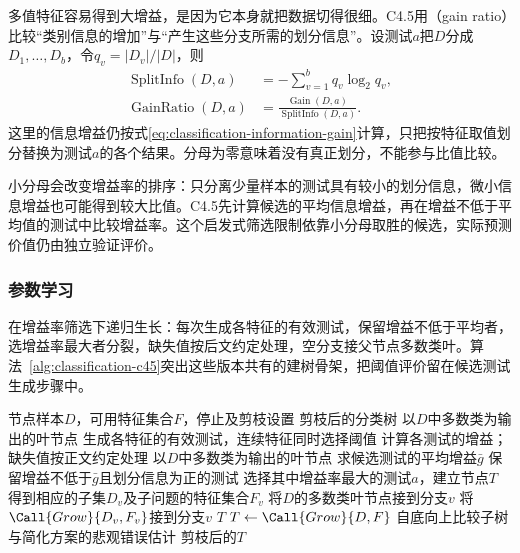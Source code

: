 多值特征容易得到大增益，是因为它本身就把数据切得很细。C4.5用（gain ratio）比较“类别信息的增加”与“产生这些分支所需的划分信息”。设测试$a$把$D$分成$D_1,\ldots,D_b$，令$q_v=|D_v|/|D|$，则
\begin{align}
  \operatorname{SplitInfo}(D,a)
  &=-\sum_{v=1}^{b}q_v\log_2 q_v,
  \label{eq:classification-split-information}\\
  \operatorname{GainRatio}(D,a)
  &=\frac{\operatorname{Gain}(D,a)}
          {\operatorname{SplitInfo}(D,a)}.
  \label{eq:classification-gain-ratio}
\end{align}
这里的信息增益仍按式\eqref{eq:classification-information-gain}计算，只把按特征取值划分替换为测试$a$的各个结果。分母为零意味着没有真正划分，不能参与比值比较。

小分母会改变增益率的排序：只分离少量样本的测试具有较小的划分信息，微小信息增益也可能得到较大比值。C4.5先计算候选的平均信息增益，再在增益不低于平均值的测试中比较增益率。这个启发式筛选限制依靠小分母取胜的候选，实际预测价值仍由独立验证评价。

\subsubsection{参数学习}
\label{sec:classification-c45-learning}

在增益率筛选下递归生长：每次生成各特征的有效测试，保留增益不低于平均者，选增益率最大者分裂，缺失值按后文约定处理，空分支接父节点多数类叶。算法~\ref{alg:classification-c45}突出这些版本共有的建树骨架，把阈值评价留在候选测试生成步骤中。

\begin{algorithm}[C4.5的递归生长与后剪枝]
  \label{alg:classification-c45}
  \begin{algorithmic}[1]
    \Require 节点样本$D$，可用特征集合$F$，停止及剪枝设置
    \Ensure 剪枝后的分类树
        \State \Return 以$D$中多数类为输出的叶节点
      \EndIf
      \State 生成各特征的有效测试，连续特征同时选择阈值
      \State 计算各测试的增益；缺失值按正文约定处理
        \State \Return 以$D$中多数类为输出的叶节点
      \EndIf
      \State 求候选测试的平均增益$\bar g$
      \State 保留增益不低于$\bar g$且划分信息为正的测试
      \State 选择其中增益率最大的测试$a$，建立节点$T$
        \State 得到相应的子集$D_v$及子问题的特征集合$F_v$
          \State 将$D$的多数类叶节点接到分支$v$
        \Else
          \State 将$\Call{Grow}{D_v,F_v}$接到分支$v$
        \EndIf
      \EndFor
      \State \Return $T$
    \EndFunction
    \State $T\gets\Call{Grow}{D,F}$
    \State 自底向上比较子树与简化方案的悲观错误估计
    \State \Return 剪枝后的$T$
  \end{algorithmic}
\end{algorithm}

